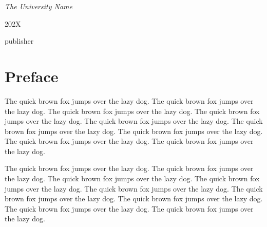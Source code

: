 \documentclass[openany,twoside,12pt]{book}
\theoremstyle{plain}
\numberwithin{equation}{chapter}
\numberwithin{figure}{chapter}
\numberwithin{table}{chapter}
\newcommand{\plogo}{\fbox{$\mathcal{PL}$}} %
\begin{document}
\begin{titlepage}
  \vspace{0.5\baselineskip} %

  \textit{The University Name} %

  \vfill %


  \plogo %

  \vspace{0.3\baselineskip} %

  202X %

  {\large publisher} %

\end{titlepage}


\thispagestyle{empty}

\frontmatter


\chapter{Preface}

The quick brown fox jumps over the lazy dog. The quick brown fox jumps over the lazy dog. The quick brown fox jumps over the lazy dog. The quick brown fox jumps over the lazy dog. The quick brown fox jumps over the lazy dog. The quick brown fox jumps over the lazy dog. The quick brown fox jumps over the lazy dog. The quick brown fox jumps over the lazy dog. The quick brown fox jumps over the lazy dog.


The quick brown fox jumps over the lazy dog. The quick brown fox jumps over the lazy dog. The quick brown fox jumps over the lazy dog. The quick brown fox jumps over the lazy dog. The quick brown fox jumps over the lazy dog. The quick brown fox jumps over the lazy dog. The quick brown fox jumps over the lazy dog. The quick brown fox jumps over the lazy dog. The quick brown fox jumps over the lazy dog.



\cleardoublepage
{}
{}
\tableofcontents

\end{document}
